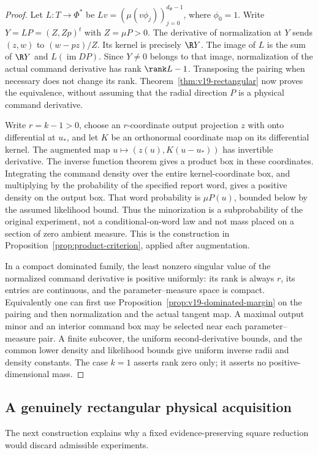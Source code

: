 \begin{proof}
Let $L:T\to\Phi^*$ be $Lv=(\mu(v\phi_j))_{j=0}^{d_\Phi-1}$,
where $\phi_0=1$. Write $Y=LP=(Z,Zp)^t$ with $Z=\mu P>0$.
The derivative of normalization at $Y$ sends
$(z,w)$ to $(w-pz)/Z$. Its kernel is precisely $\R Y$.
The image of $L$ is the sum of $\R Y$ and $L(\operatorname{im}DP)$.
Since $Y\ne0$ belongs to that image, normalization of the actual
command derivative has rank $\rank L-1$. Transposing the pairing
when necessary does not change its rank. Theorem~\ref{thm:v19-rectangular}
now proves the equivalence, without assuming that the radial direction
$P$ is a physical command derivative.

Write $r=k-1>0$, choose an $r$-coordinate output projection $z$ with
onto differential at $u_*$, and let $K$ be an orthonormal coordinate
map on its differential kernel. The augmented map
$u\mapsto(z(u),K(u-u_*))$ has invertible derivative. The inverse
function theorem gives a product box in these coordinates. Integrating
the command density over the entire kernel-coordinate box, and
multiplying by the probability of the specified report word, gives a
positive density on the output box. That word probability is
$\mu P(u)$, bounded below by the assumed likelihood bound. Thus the
minorization is a subprobability of the original experiment, not a
conditional-on-word law and not mass placed on a section of zero
ambient measure. This is the construction in
Proposition~\ref{prop:product-criterion}, applied after augmentation.

In a compact dominated family, the least nonzero singular value of
the normalized command derivative is positive uniformly: its rank is
always $r$, its entries are continuous, and the parameter--measure
space is compact. Equivalently one can first use
Proposition~\ref{prop:v19-dominated-margin} on the pairing and then
normalization and the actual tangent map. A maximal output minor and
an interior command box may be selected near each parameter--measure
pair. A finite subcover, the uniform second-derivative bounds, and the
common lower density and likelihood bounds give uniform inverse
radii and density constants. The case $k=1$ asserts rank zero only;
it asserts no positive-dimensional mass.
\end{proof}

\subsection{A genuinely rectangular physical acquisition}
The next construction explains why a fixed evidence-preserving square
reduction would discard admissible experiments.

